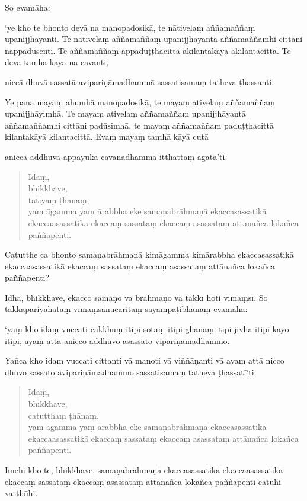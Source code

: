 \documentclass[11pt,twoside,openright]{book}
\begin{document}
\pstart
So evamāha:
\pend

\pstart
‘ye kho te bhonto devā na manopadosikā, te nātivelaṃ aññamaññaṃ upanijjhāyanti. Te nātivelaṃ aññamaññaṃ upanijjhāyantā aññamaññamhi cittāni nappadūsenti. Te aññamaññaṃ appaduṭṭhacittā akilantakāyā akilantacittā. Te devā tamhā kāyā na cavanti,
\pend

\pstart
niccā dhuvā sassatā avipariṇāmadhammā sassatisamaṃ tatheva ṭhassanti.
\pend

\pstart
Ye pana mayaṃ ahumhā manopadosikā, te mayaṃ ativelaṃ aññamaññaṃ upanijjhāyimhā. Te mayaṃ ativelaṃ aññamaññaṃ upanijjhāyantā aññamaññamhi cittāni padūsimhā, te mayaṃ aññamaññaṃ paduṭṭhacittā kilantakāyā kilantacittā. Evaṃ mayaṃ tamhā kāyā cutā
\pend

\pstart
aniccā addhuvā appāyukā cavanadhammā itthattaṃ āgatā’ti.
\pend

\begin{verse}
Idaṃ,\\
\vin  bhikkhave,\\
\vin  tatiyaṃ ṭhānaṃ,\\
\vin  yaṃ āgamma yaṃ ārabbha eke samaṇabrāhmaṇā ekaccasassatikā ekaccaasassatikā ekaccaṃ sassataṃ ekaccaṃ asassataṃ attānañca lokañca paññapenti.

\end{verse}
\pstart
Catutthe ca bhonto samaṇabrāhmaṇā kimāgamma kimārabbha ekaccasassatikā ekaccaasassatikā ekaccaṃ sassataṃ ekaccaṃ asassataṃ attānañca lokañca paññapenti?
\pend

\pstart
Idha, bhikkhave, ekacco samaṇo vā brāhmaṇo vā takkī hoti vīmaṃsī. So takkapariyāhataṃ vīmaṃsānucaritaṃ sayampaṭibhānaṃ evamāha:
\pend

\pstart
‘yaṃ kho idaṃ vuccati cakkhuṃ itipi sotaṃ itipi ghānaṃ itipi jivhā itipi kāyo itipi, ayaṃ attā anicco addhuvo asassato vipariṇāmadhammo.
\pend

\pstart
Yañca kho idaṃ vuccati cittanti vā manoti vā viññāṇanti vā ayaṃ attā nicco dhuvo sassato avipariṇāmadhammo sassatisamaṃ tatheva ṭhassatī’ti.
\pend

\begin{verse}
Idaṃ,\\
\vin  bhikkhave,\\
\vin  catutthaṃ ṭhānaṃ,\\
\vin  yaṃ āgamma yaṃ ārabbha eke samaṇabrāhmaṇā ekaccasassatikā ekaccaasassatikā ekaccaṃ sassataṃ ekaccaṃ asassataṃ attānañca lokañca paññapenti.

\end{verse}
\pstart
Imehi kho te, bhikkhave, samaṇabrāhmaṇā ekaccasassatikā ekaccaasassatikā ekaccaṃ sassataṃ ekaccaṃ asassataṃ attānañca lokañca paññapenti catūhi vatthūhi.
\pend
\end{document}
